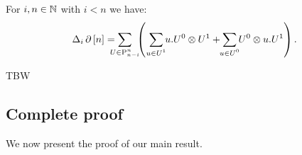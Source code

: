 \begin{proposition}\label{p:fact1}
	For $i,n \in \mathbb{N}$ with $i < n$ we have:
	\[
	\Delta_i \bd \, [n] =
	\sum_{\mathclap{U \in \P_{n-i}^n}} \
	\left(\
	\sum_{\mathclap{u \in U^1}} u.U^0 \ot U^1 +
	\sum_{\mathclap{u \in U^0}} U^0 \ot u.U^1
	\right).
	\]
\end{proposition}

\begin{proposition}\label{p:fact2}
	TBW
\end{proposition}

\subsection{Complete proof}\label{ss:proof}

We now present the proof of our main result.

